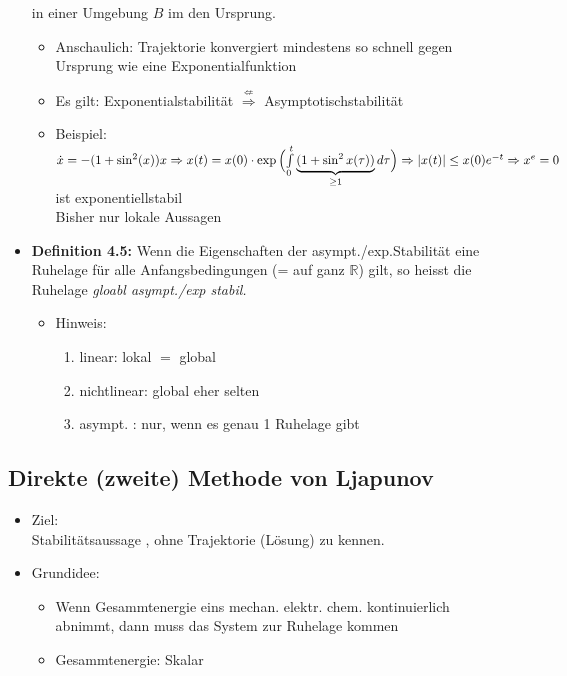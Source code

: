 \documentclass[11pt,a4paper]{article}
\begin{document}
\begin{itemize}
\begin{equation*}
\end{equation*}
in einer Umgebung $B$ im den Ursprung.
\begin{itemize}
\item Anschaulich: Trajektorie konvergiert mindestens so schnell gegen Ursprung wie eine Exponentialfunktion
\item Es gilt: Exponentialstabilität $ \stackrel{\nLeftarrow}{\Rightarrow} $ Asymptotischstabilität
\item Beispiel: $\dot x  = -(1+ \sin^2(x)) x\\
\Rightarrow x(t) = x(0) \cdot \exp\Big({ \int \limits_{0}^{t} \underbrace{(1+\sin^2x(\tau))}_{\ge 1}d\tau }\Big)\\
\Rightarrow |x(t)| \le x(0)e^{-t} \\
\Rightarrow x^e = 0
$ ist exponentiellstabil\\
Bisher nur lokale Aussagen
\end{itemize}
\item \textbf{Definition 4.5:} Wenn die Eigenschaften der asympt./exp.Stabilität eine Ruhelage für alle Anfangsbedingungen (= auf ganz $\mathbb{R}$) gilt, so heisst die Ruhelage \textit{gloabl asympt./exp stabil.}
\begin{itemize}
\item Hinweis: 
\begin{enumerate}
\item linear: lokal $=$ global
\item nichtlinear: global eher selten
\item asympt. : nur, wenn es genau 1 Ruhelage gibt 
\begin{figure}[H] 
  \centering 
  \def\svgwidth{350pt} 
   
\end{figure} 
\end{enumerate}
\end{itemize}
\end{itemize}
\subsection{Direkte (zweite) Methode von Ljapunov}
\begin{itemize}
\item Ziel: \\Stabilitätsaussage , ohne Trajektorie (Lösung) zu kennen.
\item Grundidee: 
\begin{itemize}
\item Wenn Gesammtenergie eins mechan. elektr. chem. kontinuierlich abnimmt, dann muss das System zur Ruhelage kommen
\item Gesammtenergie: Skalar
\end{itemize}
\end{itemize}
\end{document}
